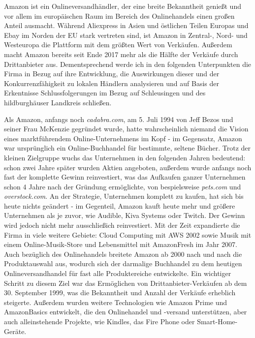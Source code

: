 Amazon ist ein Onlineversandhändler, der eine breite Bekanntheit genießt und vor allem im europäischen Raum im Bereich des Onlinehandels einen großen Anteil ausmacht. Während Aliexpress in Asien und östlichen Teilen Europas und Ebay im Norden der EU stark vertreten sind, ist Amazon in Zentral-, Nord- und Westeuropa die Plattform mit dem größten Wert von Verkäufen\cite[S. 22]{EuroCommerce}. Außerdem macht Amazon bereits seit Ende 2017 mehr als die Hälfte der Verkäufe durch Drittanbieter aus\cite[S. 25]{Haendlerbund}. Dementsprechend werde ich in den folgenden Unterpunkten die Firma in Bezug auf ihre Entwicklung, die Auswirkungen dieser und der Konkurrenzfähigkeit zu lokalen Händlern analysieren und auf Basis der Erkentnisse Schlussfolgerungen im Bezug auf Schleusingen und des hildburghäuser Landkreis schließen.

Als Amazon, anfangs noch \emph{cadabra.com}, am 5. Juli 1994 von Jeff Bezos und seiner Frau McKenzie gegründet wurde, hatte wahrscheinlich niemand die Vision eines marktführendem Online-Unternehmens im Kopf - im Gegensatz, Amazon war ursprünglich ein Online-Buchhandel für bestimmte, seltene Bücher\cite[S. 17]{Graf}. Trotz der kleinen Zielgruppe wuchs das Unternehmen in den folgenden Jahren bedeutend: schon zwei Jahre später wurden Aktien angeboten, außerdem wurde anfangs noch fast der komplette Gewinn reinvestiert\cite{Rosoff}, was das Aufkaufen ganzer Unternehmen schon 4 Jahre nach der Gründung ermöglichte, von bespielsweise \emph{pets.com} und \emph{overstock.com}\cite{ChannelAdvisor}. An der Strategie, Unternehmen komplett zu kaufen, hat sich bis heute nichts geändert - im Gegenteil, Amazon kauft heute mehr und größere Unternehmen als je zuvor\cite[S. 27]{Haendlerbund}, wie Audible, Kiva Systems oder Twitch\cite{Sherman}. Der Gewinn wird jedoch nicht mehr ausschließich reinvestiert\cite{Rosoff}. Mit der Zeit expandierte die Firma in viele weitere Gebiete: Cloud Computing mit \ac{AWS} 2002 sowie Musik mit einem Online-Musik-Store und Lebensmittel mit AmazonFresh im Jahr 2007\cite{Sherman, ChannelAdvisor}. Auch bezüglich des Onlinehandels breitete Amazon ab 2000 nach und nach die Produktauswahl aus, wodurch sich der darmalige Buchhandel zu dem heutigen Onlineversandhandel für fast alle Produktereiche entwickelte. Ein wichtiger Schritt zu diesem Ziel war das Ermöglichen von Drittanbieter-Verkäufen ab dem 30. September 1999, was die Bekanntheit und Anzahl der Verkäufe erheblich steigerte\cite{Sherman}. Außerdem wurden weitere Technologien wie Amazon Prime und AmazonBasics entwickelt, die den Onlinehandel und -versand unterstützen\cite{ChannelAdvisor}, aber auch alleinstehende Projekte, wie Kindles, das Fire Phone oder Smart-Home-Geräte\cite{Sherman}.

